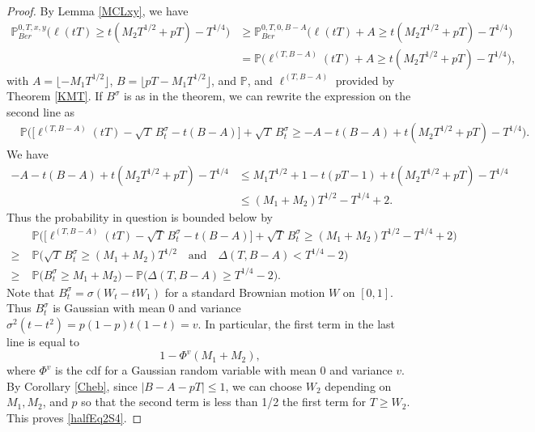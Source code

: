 \begin{proof}
	By Lemma \ref{MCLxy}, we have
	\begin{align*}
	\mathbb{P}^{0,T,x,y}_{Ber}\bigg( \ell( tT )  \geq t(M_2T^{1/2} + p T) - T^{1/4} \bigg) &\geq \mathbb{P}^{0,T,0,B-A}_{Ber}\bigg( \ell( tT ) + A  \geq t(M_2T^{1/2} + p T) - T^{1/4} \bigg)\\
	&= \mathbb{P}\bigg( \ell^{(T,B-A)}( tT ) + A  \geq t(M_2T^{1/2} + p T) - T^{1/4} \bigg),
	\end{align*}
	with $A = \lfloor -M_1T^{1/2}\rfloor$, $B = \lfloor pT-M_1T^{1/2}\rfloor$, and $\mathbb{P}$, and $\ell^{(T,B-A)}$ provided by Theorem \ref{KMT}. If $B^\sigma$ is as in the theorem, we can rewrite the expression on the second line as
	\begin{align*}
	& \mathbb{P}\bigg( \big[\ell^{(T,B-A)}( tT ) -\sqrt{T}\,B^\sigma_t - t(B-A)\big] + \sqrt{T}\,B^\sigma_t \geq -A - t(B-A) + t(M_2T^{1/2} + p T) - T^{1/4} \bigg).
	\end{align*}
	We have
	\begin{align*}
	-A - t(B-A) + t(M_2T^{1/2} + p T) - T^{1/4} & \leq M_1T^{1/2} + 1 - t(pT-1) + t(M_2T^{1/2} + p T) - T^{1/4}\\
	&\leq (M_1 + M_2)T^{1/2} - T^{1/4} + 2.
	\end{align*}
	Thus the probability in question is bounded below by
	\begin{align*}
	& \mathbb{P}\bigg( \big[\ell^{(T,B-A)}( tT ) -\sqrt{T}\,B^\sigma_t - t(B-A)\big] + \sqrt{T}\,B^\sigma_t  \geq (M_1 + M_2)T^{1/2} - T^{1/4} + 2 \bigg)\\
	\geq \; & \mathbb{P}\bigg( \sqrt{T}\,B^\sigma_t \geq (M_1 + M_2)T^{1/2} \quad \mathrm{and} \quad \Delta(T,B-A) < T^{1/4} - 2 \bigg)\\
	\geq \; & \mathbb{P}\big( B^\sigma_t \geq M_1 + M_2 \big) - \mathbb{P}\big( \Delta(T,B-A) \geq T^{1/4} - 2 \big).
	\end{align*}
	Note that $B^\sigma_t = \sigma(W_t - tW_1)$ for a standard Brownian motion $W$ on $[0,1]$. Thus $B^\sigma_t$ is Gaussian with mean 0 and variance $\sigma^2(t-t^2) = p(1-p)t(1-t) = v$. In particular, the first term in the last line is equal to
	\[
	1 - \Phi^v(M_1+M_2),
	\]
	where $\Phi^v$ is the cdf for a Gaussian random variable with mean 0 and variance $v$. By Corollary \ref{Cheb}, since $|B-A-pT| \leq 1$, we can choose $W_2$ depending on $M_1,M_2$, and $p$ so that the second term is less than 1/2 the first term for $T\geq W_2$. This proves \eqref{halfEq2S4}.
\end{proof}


